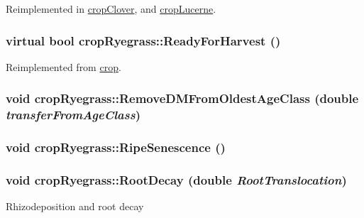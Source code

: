 Reimplemented in \hyperlink{classcrop_clover_a3a424244e4f17a802bbf8b52effdbd14}{cropClover}, and \hyperlink{classcrop_lucerne_a6eebd1599c5ae746d05fdae4c82c60fb}{cropLucerne}.\hypertarget{classcrop_ryegrass_a621ec6683bbbf9ff717db7c9a428e722}{
\subsubsection[{ReadyForHarvest}]{\setlength{\rightskip}{0pt plus 5cm}virtual bool cropRyegrass::ReadyForHarvest ()}}
\label{classcrop_ryegrass_a621ec6683bbbf9ff717db7c9a428e722}


Reimplemented from \hyperlink{classcrop_a8f2d5d0807fb0a81e50ea09e6df594ac}{crop}.\hypertarget{classcrop_ryegrass_aa5b4bfccf6d06ebf0058b3348255e840}{
\subsubsection[{RemoveDMFromOldestAgeClass}]{\setlength{\rightskip}{0pt plus 5cm}void cropRyegrass::RemoveDMFromOldestAgeClass (double {\em transferFromAgeClass})}}
\label{classcrop_ryegrass_aa5b4bfccf6d06ebf0058b3348255e840}
\hypertarget{classcrop_ryegrass_a65e6d648842b070c8dfe343d548dee1c}{
\subsubsection[{RipeSenescence}]{\setlength{\rightskip}{0pt plus 5cm}void cropRyegrass::RipeSenescence ()}}
\label{classcrop_ryegrass_a65e6d648842b070c8dfe343d548dee1c}
\hypertarget{classcrop_ryegrass_a7b2e92086e8aa5ae0d41c5b7e7678181}{
\subsubsection[{RootDecay}]{\setlength{\rightskip}{0pt plus 5cm}void cropRyegrass::RootDecay (double {\em RootTranslocation})}}
\label{classcrop_ryegrass_a7b2e92086e8aa5ae0d41c5b7e7678181}
Rhizodeposition and root decay 

